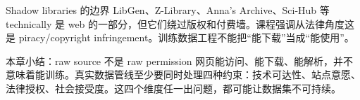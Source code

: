 \begin{warningbox}{Shadow libraries 的边界}
LibGen、Z-Library、Anna's Archive、Sci-Hub 等 technically 是 web 的一部分，但它们绕过版权和付费墙。课程强调从法律角度这是 piracy/copyright infringement。训练数据工程不能把“能下载”当成“能使用”。
\end{warningbox}

\begin{importantbox}{本章小结：raw source 不是 raw permission}
网页能访问、能下载、能解析，并不意味着能训练。真实数据管线至少要同时处理四种约束：技术可达性、站点意愿、法律授权、社会接受度。这四个维度任一出问题，都可能让数据集不可持续。
\end{importantbox}

